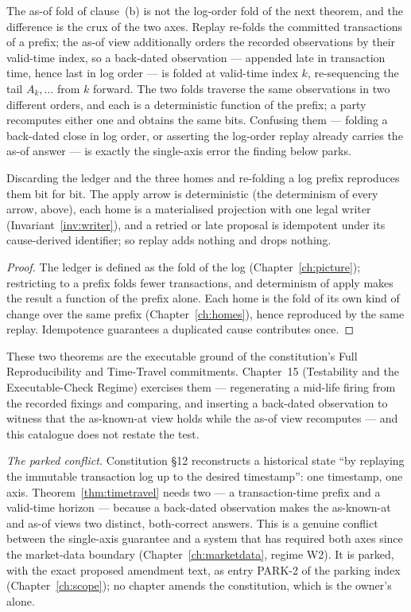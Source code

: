 The as-of fold of clause~(b) is not the log-order fold of the next theorem, and the
difference is the crux of the two axes. Replay re-folds the committed transactions of a
prefix; the as-of view additionally orders the recorded observations by their valid-time
index, so a back-dated observation --- appended late in transaction time, hence last in
log order --- is folded at valid-time index $k$, re-sequencing the tail $A_k,\dots$ from $k$
forward. The two folds traverse the same observations in two different orders, and each is
a deterministic function of the prefix; a party recomputes either one and obtains the same
bits. Confusing them --- folding a back-dated close in log order, or asserting the log-order
replay already carries the as-of answer --- is exactly the single-axis error the finding
below parks.

\begin{theorem}\label{thm:replay}
Discarding the ledger and the three homes and re-folding a log prefix reproduces
them bit for bit. The apply arrow is deterministic (the determinism of every
arrow, above), each home is a materialised projection with one legal writer
(Invariant~\ref{inv:writer}), and a retried or late proposal is
idempotent under its cause-derived identifier; so replay adds nothing and drops
nothing.
\end{theorem}

\begin{proof}
The ledger is defined as the fold of the log (Chapter~\ref{ch:picture});
restricting to a prefix folds fewer transactions, and determinism of apply makes
the result a function of the prefix alone. Each home is the fold of its own kind
of change over the same prefix (Chapter~\ref{ch:homes}), hence reproduced by the
same replay. Idempotence guarantees a duplicated cause contributes once.
\end{proof}

These two theorems are the executable ground of the constitution's Full
Reproducibility and Time-Travel commitments. Chapter~15 (Testability and the
Executable-Check Regime) exercises them --- regenerating a mid-life firing from
the recorded fixings and comparing, and inserting a back-dated observation to
witness that the as-known-at view holds while the as-of view recomputes --- and
this catalogue does not restate the test.

\emph{The parked conflict.} Constitution \S 12 reconstructs a historical state ``by
replaying the immutable transaction log up to the desired timestamp'': one timestamp, one
axis. Theorem~\ref{thm:timetravel} needs two --- a transaction-time prefix and a valid-time
horizon --- because a back-dated observation makes the as-known-at and as-of views two
distinct, both-correct answers. This is a genuine conflict between the single-axis guarantee
and a system that has required both axes since the market-data boundary
(Chapter~\ref{ch:marketdata}, regime W2). It is parked, with the exact proposed amendment
text, as entry PARK-2 of the parking index (Chapter~\ref{ch:scope}); no chapter amends the
constitution, which is the owner's alone.

